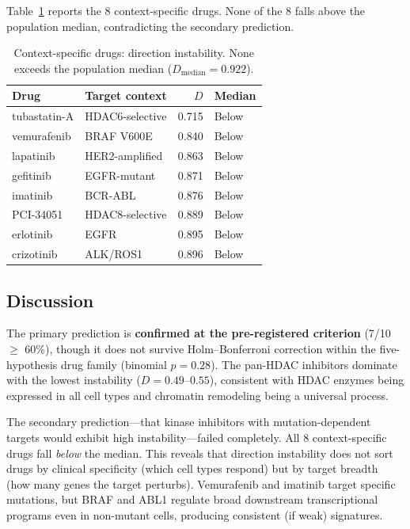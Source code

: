 \documentclass[11pt]{article}
\begin{document}
Table~\ref{tab:h2_specific} reports the 8 context-specific drugs.
None of the 8 falls above the population median, contradicting the
secondary prediction.

\begin{table}[htbp]
\centering
\caption{Context-specific drugs: direction instability.  None exceeds
the population median ($D_{\text{median}} = 0.922$).}
\label{tab:h2_specific}
\begin{tabular}{@{}llrl@{}}
\toprule
Drug & Target context & $D$ & Median \\
\midrule
tubastatin-A  & HDAC6-selective  & 0.715 & Below \\
vemurafenib   & BRAF V600E       & 0.840 & Below \\
lapatinib     & HER2-amplified   & 0.863 & Below \\
gefitinib     & EGFR-mutant      & 0.871 & Below \\
imatinib      & BCR-ABL          & 0.876 & Below \\
PCI-34051     & HDAC8-selective  & 0.889 & Below \\
erlotinib     & EGFR             & 0.895 & Below \\
crizotinib    & ALK/ROS1         & 0.896 & Below \\
\bottomrule
\end{tabular}
\end{table}

\subsection{Discussion}

The primary prediction is \textbf{confirmed at the pre-registered
criterion} (7/10 $\geq$ 60\%), though it does not survive Holm--Bonferroni
correction within the five-hypothesis drug family (binomial
$p = 0.28$).  The pan-HDAC inhibitors dominate with the lowest
instability ($D = 0.49$--$0.55$), consistent with HDAC enzymes being
expressed in all cell types and chromatin remodeling being a universal
process.

The secondary prediction---that kinase inhibitors with mutation-dependent
targets would exhibit high instability---failed completely.  All 8
context-specific drugs fall \emph{below} the median.  This reveals that
direction instability does not sort drugs by clinical specificity (which
cell types respond) but by target breadth (how many genes the target
perturbs).  Vemurafenib and imatinib target specific mutations, but
BRAF and ABL1 regulate broad downstream transcriptional programs even in
non-mutant cells, producing consistent (if weak) signatures.
\end{document}
